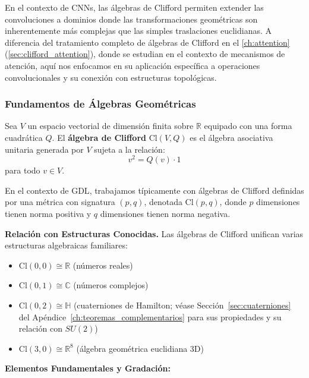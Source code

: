 En el contexto de CNNs, las álgebras de Clifford permiten extender las convoluciones a dominios donde las transformaciones geométricas son inherentemente más complejas que las simples traslaciones euclidianas. A diferencia del tratamiento completo de álgebras de Clifford en el \autoref{ch:attention} (\autoref{sec:clifford_attention}), donde se estudian en el contexto de mecanismos de atención, aquí nos enfocamos en su aplicación específica a operaciones convolucionales y su conexión con estructuras topológicas.

\subsubsection{Fundamentos de Álgebras Geométricas}

\begin{definition}\label{def:clifford_cnn}
Sea $V$ un espacio vectorial de dimensión finita sobre $\mathbb{R}$ equipado con una forma cuadrática $Q$. El \textbf{álgebra de Clifford} $\text{Cl}(V,Q)$ es el álgebra asociativa unitaria generada por $V$ sujeta a la relación:
\[v^2 = Q(v) \cdot 1\]
para todo $v \in V$.
\end{definition}

En el contexto de \gls{GDL}, trabajamos típicamente con álgebras de Clifford definidas por una métrica con signatura $(p,q)$, denotada $\text{Cl}(p,q)$, donde $p$ dimensiones tienen norma positiva y $q$ dimensiones tienen norma negativa.

\textbf{Relación con Estructuras Conocidas.}\label{rem:clifford_structures} Las álgebras de Clifford unifican varias estructuras algebraicas familiares:
\begin{itemize}
    \item $\text{Cl}(0,0) \cong \mathbb{R}$ (números reales)
    \item $\text{Cl}(0,1) \cong \mathbb{C}$ (números complejos)
    \item $\text{Cl}(0,2) \cong \mathbb{H}$ (cuaterniones de Hamilton; véase Sección~\ref{sec:cuaterniones} del Apéndice~\ref{ch:teoremas_complementarios} para sus propiedades y su relación con $SU(2)$)
    \item $\text{Cl}(3,0) \cong \mathbb{R}^{8}$ (álgebra geométrica euclidiana 3D)
\end{itemize}

\textbf{Elementos Fundamentales y Gradación:}


